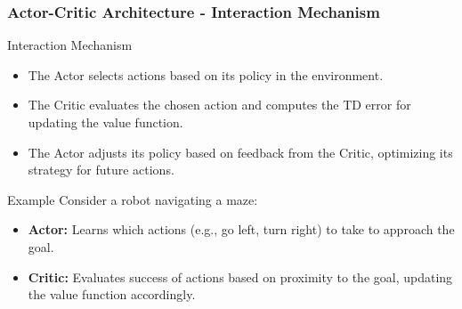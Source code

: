 \documentclass{beamer}
\begin{document}
\begin{frame}[fragile]
    \frametitle{Actor-Critic Architecture - Interaction Mechanism}
    \begin{block}{Interaction Mechanism}
        \begin{itemize}
            \item The Actor selects actions based on its policy in the environment.
            \item The Critic evaluates the chosen action and computes the TD error for updating the value function.
            \item The Actor adjusts its policy based on feedback from the Critic, optimizing its strategy for future actions.
        \end{itemize}
    \end{block}

    \begin{block}{Example}
        Consider a robot navigating a maze:
        \begin{itemize}
            \item \textbf{Actor:} Learns which actions (e.g., go left, turn right) to take to approach the goal.
            \item \textbf{Critic:} Evaluates success of actions based on proximity to the goal, updating the value function accordingly.
        \end{itemize}
    \end{block}
\end{frame}
\end{document}
